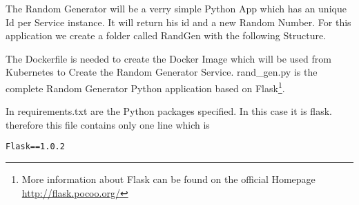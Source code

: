 The Random Generator will be a verry simple Python App which has an unique Id per Service instance. It will return his id and a new Random Number. For this application we create a folder called RandGen with the following Structure.

The Dockerfile is needed to create the Docker Image which will be used from Kubernetes to Create the Random Generator Service.
rand\_gen.py is the complete Random Generator Python application based on Flask\footnote{More information about Flask can be found on the official Homepage \url{http://flask.pocoo.org/}}.
 
In requirements.txt are the Python packages specified. In this case it is flask. therefore this file contains only one line which is
\begin{verbatim}
Flask==1.0.2
\end{verbatim}


